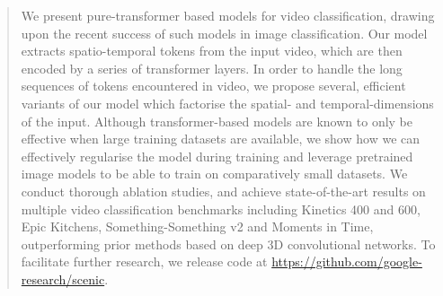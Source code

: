 \begin{abstract}
	
We present pure-transformer based models for video classification, drawing upon the recent success of such models in image classification.
Our model extracts spatio-temporal tokens from the input video, which are then encoded by a series of transformer layers.
In order to handle the long sequences of tokens encountered in video, we propose several, efficient variants of our model which factorise the spatial- and temporal-dimensions of the input. %
Although transformer-based models are known to only be effective when large training datasets are available, we show how we can effectively regularise the model during training and leverage pretrained image models to be able to train on comparatively small datasets.
We conduct thorough ablation studies, and achieve state-of-the-art results on multiple video classification benchmarks including Kinetics 400 and 600, Epic Kitchens, Something-Something v2 and Moments in Time, outperforming prior methods based on deep 3D convolutional networks.
To facilitate further research, we release code at \href{https://github.com/google-research/scenic/tree/main/scenic/projects/vivit}{https://github.com/google-research/scenic}.



\end{abstract}